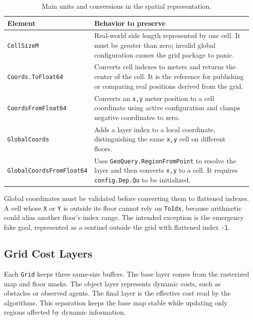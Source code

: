 \documentclass[12pt,a4paper]{report}
\begin{document}
\begin{table}[H]
\centering
\begin{tabular}{|p{}|p{}|}
\hline
\textbf{Element} & \textbf{Behavior to preserve} \\
\hline
\texttt{CellSizeM} &
Real-world side length represented by one cell. It must be greater than zero;
invalid global configuration causes the grid package to panic. \\
\hline
\texttt{Coords.ToFloat64} &
Converts cell indexes to meters and returns the center of the cell. It is the
reference for publishing or comparing real positions derived from the grid. \\
\hline
\texttt{CoordsFromFloat64} &
Converts an \texttt{x,y} meter position to a cell coordinate using active
configuration and clamps negative coordinates to zero. \\
\hline
\texttt{GlobalCoords} &
Adds a layer index to a local coordinate, distinguishing the same \texttt{x,y}
cell on different floors. \\
\hline
\texttt{GlobalCoordsFromFloat64} &
Uses \texttt{GeoQuery.RegionFromPoint} to resolve the layer and then converts
\texttt{x,y} to a cell. It requires \texttt{config.Dep.Qu} to be initialized. \\
\hline
\end{tabular}
\caption{Main units and conversions in the spatial representation.}
\end{table}

Global coordinates must be validated before converting them to flattened
indexes. A cell whose \texttt{X} or \texttt{Y} is outside its floor cannot rely
on \texttt{ToIdx}, because arithmetic could alias another floor's index range.
The intended exception is the emergency fake goal, represented as a sentinel
outside the grid with flattened index \texttt{-1}.

\subsection{Grid Cost Layers}

Each \texttt{Grid} keeps three same-size buffers. The base layer comes from the
rasterized map and floor masks. The object layer represents dynamic costs, such
as obstacles or observed agents. The final layer is the effective cost read by
the algorithms. This separation keeps the base map stable while updating only
regions affected by dynamic information.
\end{document}
